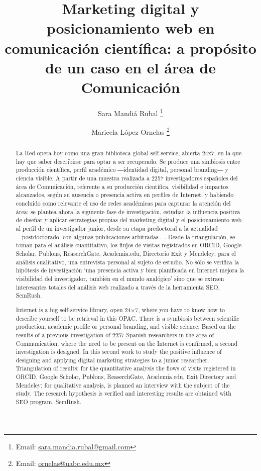 \documentclass{textolivre}
\title{Marketing digital y posicionamiento web en comunicación científica: a propósito de un caso en el área de Comunicación}
\author[1]{Sara Mandiá Rubal \orcid{0000-0003-4452-2751} \thanks{Email: \url{sara.mandia.rubal@gmail.com}}}
\author[2]{Maricela López Ornelas \orcid{0000-0002-4215-5591} \thanks{Email: \url{ornelas@uabc.edu.mx}}}
\affil[1]{Universidade da Coruña, España.}
\affil[2]{Universidad Autónoma de Baja California, México.}
\begin{document}
\maketitle

\begin{polyabstract}
\begin{abstract}
La Red opera hoy como una gran biblioteca global self-service, abierta 24x7, en la que hay que saber describirse para optar a ser recuperado. Se produce una simbiosis entre producción científica, perfil académico ―identidad digital, personal branding― y ciencia visible. A partir de una muestra realizada a 2257 investigadores españoles del área de Comunicación, referente a su producción científica, visibilidad e impactos alcanzados, según su ausencia o presencia activa en perfiles de Internet; y habiendo concluido como relevante el uso de redes académicas para capturar la atención del área; se plantea ahora la siguiente fase de investigación, estudiar la influencia positiva de diseñar y aplicar estrategias propias del marketing digital y el posicionamiento web al perfil de un investigador junior, desde su etapa predoctoral a la actualidad ―postdoctorado, con algunas publicaciones arbitradas―. Desde la triangulación, se toman para el análisis cuantitativo, los flujos de visitas registrados en ORCID, Google Scholar, Publons, ReaserchGate, Academia.edu, Directorio Exit y Mendeley; para el análisis cualitativo, una entrevista personal al sujeto de estudio. No sólo se verifica la hipótesis de investigación ‘una presencia activa y bien planificada en Internet mejora la visibilidad del investigador, también en el mundo analógico’ sino que se extraen interesantes totales del análisis web realizado a través de la herramienta SEO, SemRush.

\end{abstract}

\begin{english}
\begin{abstract}
Internet is a big self-service library, open 24×7, where you have to know how to describe yourself to be retrieval in this OPAC. There is a symbiosis between scientific production, academic profile or personal branding, and visible science. Based on the results of a previous investigation of 2257 Spanish researchers in the area of Communication, where the need to be present on the Internet is confirmed, a second investigation is designed. In this second work to study the positive influence of designing and applying digital marketing strategies to a junior researcher. Triangulation of results: for the quantitative analysis the flows of visits registered in ORCID, Google Scholar, Publons, ReaserchGate, Academia.edu, Exit Directory and Mendeley; for qualitative analysis, is planned an interview with the subject of the study. The research hypothesis is verified and interesting results are obtained with SEO program, SemRush.


\end{abstract}
\end{english}
\end{polyabstract}
\end{document}
